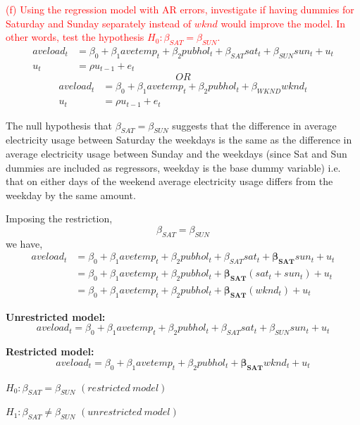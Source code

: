 \documentclass[12pt]{report}
\begin{document}
\newpage
\noindent \textcolor{red}
{
	(f) Using the regression model with AR errors, investigate if having dummies for Saturday and Sunday separately instead of $wknd$ would improve the model. In other words, test the hypothesis $H_0: \beta_{SAT} = \beta_{SUN}$.
}
\begin{align*}
	aveload_t &= \beta_0 + \beta_1 avetemp_t + \beta_2pubhol_t + \beta_{SAT}sat_t + \beta_{SUN}sun_t + u_t \\
	u_t &= \rho u_{t-1} + e_t
\end{align*}
$$OR$$
\begin{align*}
aveload_t &= \beta_0 + \beta_1 avetemp_t + \beta_2pubhol_t + \beta_{WKND}wknd_t\\
u_t &= \rho u_{t-1} + e_t
\end{align*}

\noindent The null hypothesis that $\beta_{SAT} = \beta_{SUN}$ suggests that the difference in average electricity usage between Saturday the weekdays is the same as the difference in average electricity usage between Sunday and the weekdays (since Sat and Sun dummies are included as regressors, weekday is the base dummy variable) i.e. that on either days of the weekend average electricity usage differs from the weekday by the same amount.

\noindent Imposing the restriction,
$$\beta_{SAT} = \beta_{SUN}$$
\noindent we have, 
\begin{align*}
aveload_t &= \beta_0 + \beta_1 avetemp_t + \beta_2pubhol_t + \beta_{SAT}sat_t + \boldsymbol{\beta_{SAT}}sun_t + u_t \\
&= \beta_0 + \beta_1 avetemp_t + \beta_2pubhol_t + \boldsymbol{\beta_{SAT}}(sat_t + sun_t) + u_t \\
&= \beta_0 + \beta_1 avetemp_t + \beta_2pubhol_t + \boldsymbol{\beta_{SAT}}(wknd_t) + u_t
\end{align*}

\noindent \textbf{Unrestricted model:}
$$aveload_t = \beta_0 + \beta_1 avetemp_t + \beta_2pubhol_t + \beta_{SAT}sat_t + \beta_{SUN}sun_t + u_t$$

\noindent \textbf{Restricted model:}
$$aveload_t = \beta_0 + \beta_1 avetemp_t + \beta_2pubhol_t + \boldsymbol{\beta_{SAT}}wknd_t + u_t$$

\newpage
$H_0:\beta_{SAT} = \beta_{SUN}$ \quad $(restricted\ model)$

$H_1:\beta_{SAT} \neq \beta_{SUN}$ \quad $(unrestricted\ model)$
\end{document}
